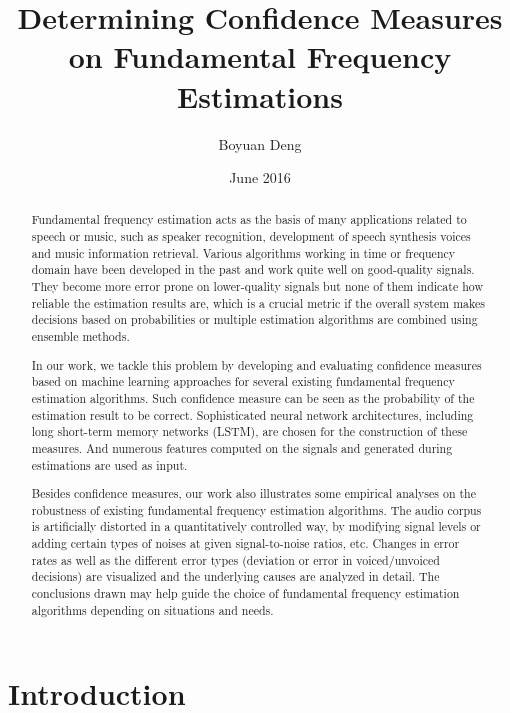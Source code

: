 \documentclass[11pt,a4paper,titlepage]{article}
\title{Determining Confidence Measures on Fundamental Frequency Estimations}
\author{Boyuan Deng}
\date{June 2016}
\begin{document}
\maketitle



\begin{abstract}
Fundamental frequency estimation acts as the basis of many applications related to speech or music, such as speaker recognition, development of speech synthesis voices and music information retrieval.
Various algorithms working in time or frequency domain have been developed in the past and work quite well on good-quality signals.
They become more error prone on lower-quality signals but none of them indicate how reliable the estimation results are, which is a crucial metric if the overall system makes decisions based on probabilities or multiple estimation algorithms are combined using ensemble methods.

In our work, we tackle this problem by developing and evaluating confidence measures based on machine learning approaches for several existing fundamental frequency estimation algorithms.
Such confidence measure can be seen as the probability of the estimation result to be correct.
Sophisticated neural network architectures, including long short-term memory networks (LSTM), are chosen for the construction of these measures.
And numerous features computed on the signals and generated during estimations are used as input.

Besides confidence measures, our work also illustrates some empirical analyses on the robustness of existing fundamental frequency estimation algorithms.
The audio corpus is artificially distorted in a quantitatively controlled way, by modifying signal levels or adding certain types of noises at given signal-to-noise ratios, etc.
Changes in error rates as well as the different error types (deviation or error in voiced/unvoiced decisions) are visualized and the underlying causes are analyzed in detail.
The conclusions drawn may help guide the choice of fundamental frequency estimation algorithms depending on situations and needs.
\end{abstract}

\newpage
  \tableofcontents
\newpage
  \listoffigures
  \listoftables
\newpage

\section{Introduction}
\end{document}
